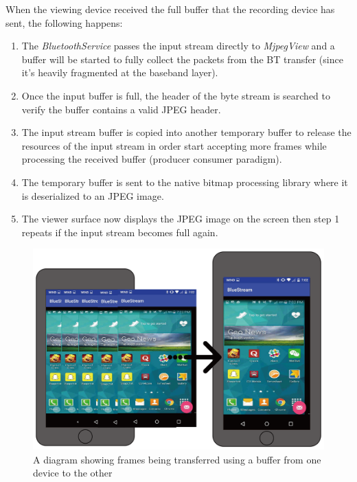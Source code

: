 \documentclass[a4paper,12pt]{article}
\begin{document}
When the viewing device received the full buffer that the recording device has sent, the following happens:

\begin{enumerate}
\item The \textit{BluetoothService} passes the input stream directly to \textit{MjpegView} and a buffer will be started to fully collect the packets from the BT transfer (since it’s heavily fragmented at the baseband layer). 
\item Once the input buffer is full, the header of the byte stream is searched to verify the buffer contains a valid JPEG header. 
\item The input stream buffer is copied into another temporary buffer to release the resources of the input stream in order start accepting more frames while processing the received buffer (producer consumer paradigm). 
\item The temporary buffer is sent to the native bitmap processing library where it is deserialized to an JPEG image.
\item The viewer surface now displays the JPEG image on the screen then step 1 repeats if the input stream becomes full again.
\end{enumerate}

\begin{figure}[h!]
\centering
\includegraphics[scale=.5]{Figures/Figure8.png}
\caption{A diagram showing frames being transferred using a buffer from one device to the other}
\label{fig:FrameSeperation}
\end{figure}
\end{document}
